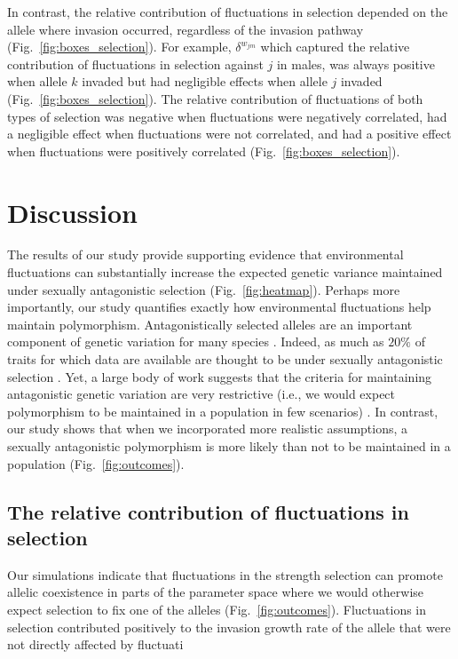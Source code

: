 \documentclass[12pt]{article}
\begin{document}
In contrast, the relative contribution of fluctuations in selection depended on the allele where invasion occurred, regardless of the invasion pathway (Fig.~\ref{fig:boxes_selection}). For example, $\delta^{w_{jm}}$ which captured the relative contribution of fluctuations in selection against $j$ in males, was always positive when allele $k$ invaded but had negligible effects when allele $j$ invaded (Fig.~\ref{fig:boxes_selection}). The relative contribution of fluctuations of both types of selection was negative when fluctuations were negatively correlated, had a negligible effect when fluctuations were not correlated, and had a positive effect when fluctuations were positively correlated (Fig.~\ref{fig:boxes_selection}).

\section{Discussion}
The results of our study provide supporting evidence that environmental fluctuations can substantially increase the expected genetic variance maintained under sexually antagonistic selection (Fig.~\ref{fig:heatmap}). Perhaps more importantly, our study quantifies exactly how environmental fluctuations help maintain polymorphism. Antagonistically selected alleles are an important component of genetic variation for many species \citep{foerster2007sexually,van2009intralocus,bonduriansky2009intralocus,innocenti2010sexually}. Indeed, as much as $20\%$ of traits for which data are available are thought to be under sexually antagonistic selection \citep{morrissey2016meta}. Yet, a large body of work suggests that the criteria for maintaining antagonistic genetic variation are very restrictive (i.e., we would expect polymorphism to be maintained in a population in few scenarios) \citep{kidwell1977regions,pamilo1979genic,hedrick1999antagonistic,curtsinger1994antagonistic, patten2010fitness}. In contrast, our study shows that when we incorporated more realistic assumptions, a sexually antagonistic polymorphism is more likely than not to be maintained in a population (Fig.~\ref{fig:outcomes}).


\subsection*{The relative contribution of fluctuations in selection}


Our simulations indicate that fluctuations in the strength selection can promote allelic coexistence in parts of the parameter space where we would otherwise expect selection to fix one of the alleles (Fig.~\ref{fig:outcomes}). Fluctuations in selection contributed positively to the invasion growth rate of the allele that were not directly affected by fluctuati
\end{document}
